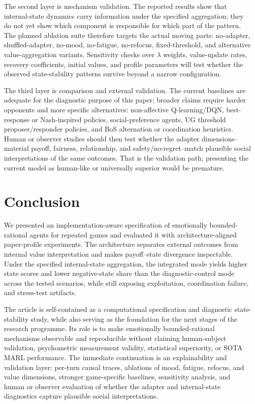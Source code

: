 \documentclass[runningheads]{llncs}
\begin{document}
The second layer is mechanism validation. The reported results show that internal-state dynamics carry information under the specified aggregation; they do not yet show which component is responsible for which part of the pattern. The planned ablation suite therefore targets the actual moving parts: no-adapter, shuffled-adapter, no-mood, no-fatigue, no-refocus, fixed-threshold, and alternative value-aggregation variants. Sensitivity checks over $\lambda$ weights, value-update rates, recovery coefficients, initial values, and profile parameters will test whether the observed state-stability patterns survive beyond a narrow configuration.

The third layer is comparison and external validation. The current baselines are adequate for the diagnostic purpose of this paper; broader claims require harder opponents and more specific alternatives: non-affective Q-learning/DQN, best-response or Nash-inspired policies, social-preference agents, UG threshold proposer/responder policies, and BoS alternation or coordination heuristics. Human or observer studies should then test whether the adapter dimensions--material payoff, fairness, relationship, and safety/no-regret--match plausible social interpretations of the same outcomes. That is the validation path; presenting the current model as human-like or universally superior would be premature.

\section{Conclusion}
We presented an implementation-aware specification of emotionally bounded-rational agents for repeated games and evaluated it with architecture-aligned paper-profile experiments. The architecture separates external outcomes from internal value interpretation and makes payoff--state divergence inspectable. Under the specified internal-state aggregation, the integrated mode yields higher state scores and lower negative-state share than the diagnostic-control mode across the tested scenarios, while still exposing exploitation, coordination failure, and stress-test artifacts.

The article is self-contained as a computational specification and diagnostic state-stability study, while also serving as the foundation for the next stages of the research programme. Its role is to make emotionally bounded-rational mechanisms observable and reproducible without claiming human-subject validation, psychometric measurement validity, statistical superiority, or SOTA MARL performance. The immediate continuation is an explainability and validation layer: per-turn causal traces, ablations of mood, fatigue, refocus, and value dimensions, stronger game-specific baselines, sensitivity analysis, and human or observer evaluation of whether the adapter and internal-state diagnostics capture plausible social interpretations.
\end{document}
